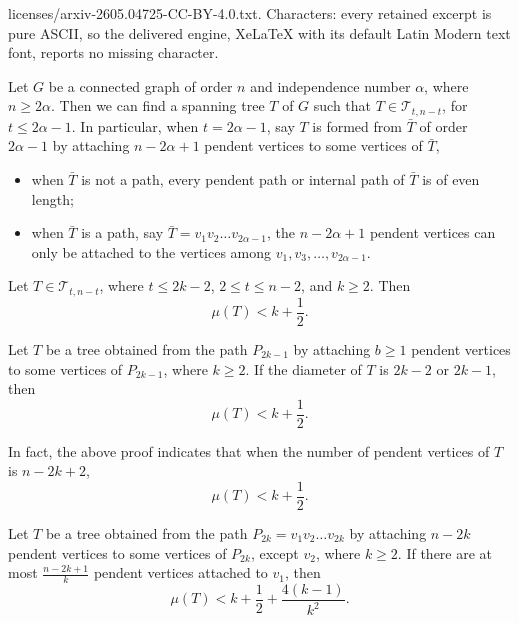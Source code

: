 \documentclass[10pt,a4paper]{amsart}
\begin{document}
licenses/arxiv-2605.04725-CC-BY-4.0.txt. Characters: every retained excerpt is pure ASCII, so the delivered engine, XeLaTeX with its default Latin Modern text font, reports no missing character.
\begin{Lemma} \label{le-final-add}
Let $G$ be a connected graph of order $n$ and independence number $\alpha$, where $n \ge 2 \alpha$. Then we can find a spanning tree $T$ of $G$ such that $T \in \mathcal{T}_{t, n-t}$, for $t \le 2 \alpha - 1$. In particular, when $t = 2 \alpha - 1$, say $T$ is formed from $\bar{T}$ of order $2 \alpha - 1$ by attaching $n - 2 \alpha + 1$ pendent vertices to some vertices of $\bar{T}$,
\begin{itemize}

\item[(i)]
when $\bar{T}$ is not a path, every pendent path or internal path of $\bar{T}$ is of even length;

\item[(ii)]

when $\bar{T}$ is a path, say $\bar{T} = v_1 v_2 \dots v_{2 \alpha - 1}$, the $n - 2 \alpha + 1$ pendent vertices can only be attached to the vertices among $v_1, v_3, \dots, v_{2 \alpha - 1}$.

\end{itemize}
\end{Lemma}

\begin{Lemma} \label{le-add}
Let $T \in \mathcal{T}_{t,n-t}$, where $t \le 2 k- 2$, $2 \le t \le n - 2$, and $k \ge 2$.
Then
$$
\mu (T) < k + \frac{1}{2}.
$$
\end{Lemma}

\begin{Lemma} \label{diameter}
Let $T$ be a tree obtained from the path $P_{2k-1}$ by attaching $b \ge 1$ pendent vertices to some vertices of $P_{2k-1}$, where $k \ge 2$. If the diameter of $T$ is $2k-2$ or $2k-1$, then
$$
\mu (T) < k + \frac{1}{2}.
$$
\end{Lemma}

\begin{Remark} \label{remark-final-add}
In fact, the above proof indicates that when the number of pendent vertices of $T$ is $n - 2k + 2$,
$$
\mu (T) < k + \frac{1}{2}.
$$
\end{Remark}

\begin{Lemma} \label{le-final-2}
Let $T$ be a tree obtained from the path $P_{2k} = v_1 v_2 \dots v_{2k}$ by attaching $n-2k$ pendent vertices to some vertices of $P_{2k}$, except $v_2$, where $k \ge 2$. If there are at most $\frac{n-2k+1}{k}$ pendent vertices attached to $v_1$, then
$$
\mu (T) < k + \frac{1}{2} + \frac{4(k-1)}{k^2}.
$$
\end{Lemma}
\end{document}
